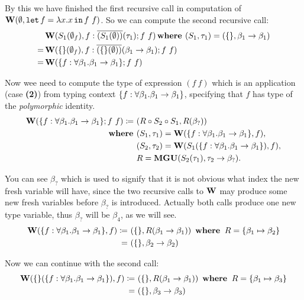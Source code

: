 \documentclass[a4paper,oneside]{memoir}
\begin{document}
By this we have finished the first recursive call in computation of \\
$\operatorname{\textbf{W}}(\emptyset, \texttt{let} \, f = \lambda x . x \, \texttt{in} \, f~f)$. So we can compute the second recursive call:
\begin{align*}
& \operatorname{\textbf{W}}(S_1(\emptyset_f),f:\overline{(S_1(\emptyset))}(\tau_1); f~f) \operatorname{\textbf{where~}} (S_1, \tau_1) = (\{\}, \beta_1 \rightarrow \beta_1 ) \\
= & \operatorname{\textbf{W}}(\{\}(\emptyset_f),f:\overline{(\{\}(\emptyset))}(\beta_1 \rightarrow \beta_1); f~f) \\
= & \operatorname{\textbf{W}}(\{f:\forall \beta_1 . \beta_1 \rightarrow \beta_1 \}; f~f)
\end{align*}

Now wee need to compute the type of expression $(f~f)$ which is an application (case \textbf{(2)}) from typing context $\{f:\forall \beta_1 . \beta_1 \rightarrow \beta_1 \}$, specifying that $f$ has type of the \textit{polymorphic} identity. 
\begin{align*}
\operatorname{\textbf{W}}(\{f:\forall \beta_1 . \beta_1 \rightarrow \beta_1 \}; f~f) \coloneqq ~ & 
(R \circ S_2 \circ S_1, R(\beta_?) ) \\
\operatorname{\textbf{where~}} & (S_1, \tau_1) = \operatorname{\textbf{W}}(\{f:\forall \beta_1 . \beta_1 \rightarrow \beta_1 \}, f), \\
       & (S_2, \tau_2) = \operatorname{\textbf{W}}(S_1(\{f:\forall \beta_1 . \beta_1 \rightarrow \beta_1 \}), f), \\
       & R = \operatorname{\textbf{MGU}}( S_2(\tau_1), \tau_2 \rightarrow \beta_? ).\\
\end{align*}

You can see $\beta_?$ which is used to signify that it is not obvious what index the new fresh variable will have, since the two recursive calls to $\operatorname{\textbf{W}}$ may produce some new fresh variables before $\beta_?$ is introduced. Actually both calls produce one new type variable, thus $\beta_?$ will be $\beta_4$, as we will see.
\begin{align*}
\operatorname{\textbf{W}}(\{f:\forall \beta_1 . \beta_1 \rightarrow \beta_1 \}, f) \coloneqq ~ & (\{\}, R(\beta_1 \rightarrow \beta_1) ) 
~ \operatorname{\textbf{where~}} R = \{\beta_1 \mapsto \beta_2\} \\
= ~ &  (\{\}, \beta_2 \rightarrow \beta_2)
\end{align*}

Now we can continue with the second call:
\begin{align*}
\operatorname{\textbf{W}}(\{\}(\{f:\forall \beta_1 . \beta_1 \rightarrow \beta_1 \}), f) \coloneqq ~ & (\{\}, R(\beta_1 \rightarrow \beta_1) ) 
~ \operatorname{\textbf{where~}} R = \{\beta_1 \mapsto \beta_3\} \\
= ~ &  (\{\}, \beta_3 \rightarrow \beta_3)
\end{align*}
\end{document}
